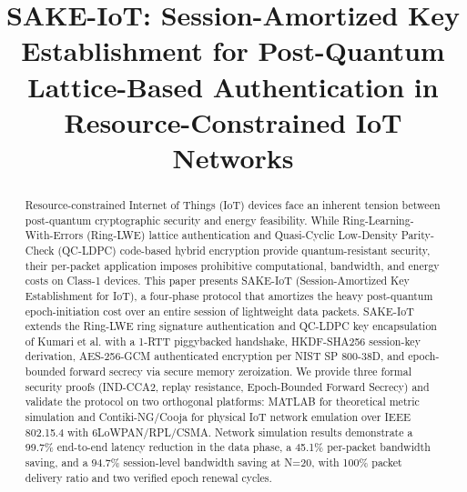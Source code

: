\documentclass[conference]{IEEEtran}
\begin{document}
\title{SAKE-IoT: Session-Amortized Key Establishment for Post-Quantum
       Lattice-Based Authentication in Resource-Constrained IoT Networks}

\author{
\and
{}
}

\maketitle

\begin{abstract}
Resource-constrained Internet of Things (IoT) devices face an inherent
tension between post-quantum cryptographic security and energy
feasibility. While Ring-Learning-With-Errors (Ring-LWE) lattice
authentication and Quasi-Cyclic Low-Density Parity-Check (QC-LDPC)
code-based hybrid encryption provide quantum-resistant security, their
per-packet application imposes prohibitive computational, bandwidth, and
energy costs on Class-1 devices. This paper presents SAKE-IoT (Session-Amortized Key Establishment for IoT), a four-phase protocol that
amortizes the heavy post-quantum epoch-initiation cost over an entire
session of lightweight data packets. SAKE-IoT extends the Ring-LWE
ring signature authentication and QC-LDPC key encapsulation of Kumari
et al. with a 1-RTT piggybacked handshake, HKDF-SHA256 session-key
derivation, AES-256-GCM authenticated encryption per NIST SP 800-38D,
and epoch-bounded forward secrecy via secure memory zeroization. We
provide three formal security proofs (IND-CCA2, replay resistance,
Epoch-Bounded Forward Secrecy) and validate the protocol on two
orthogonal platforms: MATLAB for theoretical metric simulation and
Contiki-NG/Cooja for physical IoT network emulation over IEEE 802.15.4
with 6LoWPAN/RPL/CSMA. Network simulation results demonstrate a 99.7\%
end-to-end latency reduction in the data phase, a 45.1\% per-packet
bandwidth saving, and a 94.7\% session-level bandwidth saving at N=20,
with 100\% packet delivery ratio and two verified epoch renewal cycles.
\end{abstract}
\end{document}
